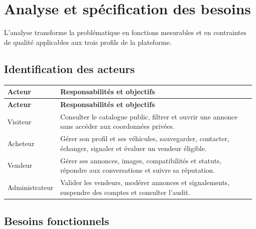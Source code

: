 \chapter{Analyse et spécification des besoins}

L'analyse transforme la problématique en fonctions mesurables et en contraintes de qualité applicables aux trois profils de la plateforme.


\section{Identification des acteurs}

{\small\singlespacing{}
\begin{longtable}{|>{\raggedright\arraybackslash}p{}|>{\raggedright\arraybackslash}p{}|}
\hline
\rowcolor{tablehead} \color{white}\bfseries Acteur & \color{white}\bfseries Responsabilités et objectifs \\ \hline
\endfirsthead
\rowcolor{tablehead} \color{white}\bfseries Acteur & \color{white}\bfseries Responsabilités et objectifs \\ \hline
\endhead
\hline\endfoot
Visiteur & Consulter le catalogue public, filtrer et ouvrir une annonce sans accéder aux coordonnées privées. \\ \hline
\rowcolor{tablerow} Acheteur & Gérer son profil et ses véhicules, sauvegarder, contacter, échanger, signaler et évaluer un vendeur éligible. \\ \hline
Vendeur & Gérer ses annonces, images, compatibilités et statuts, répondre aux conversations et suivre sa réputation. \\ \hline
\rowcolor{tablerow} Administrateur & Valider les vendeurs, modérer annonces et signalements, suspendre des comptes et consulter l'audit. \\ \hline
\end{longtable}
}


\section{Besoins fonctionnels}

